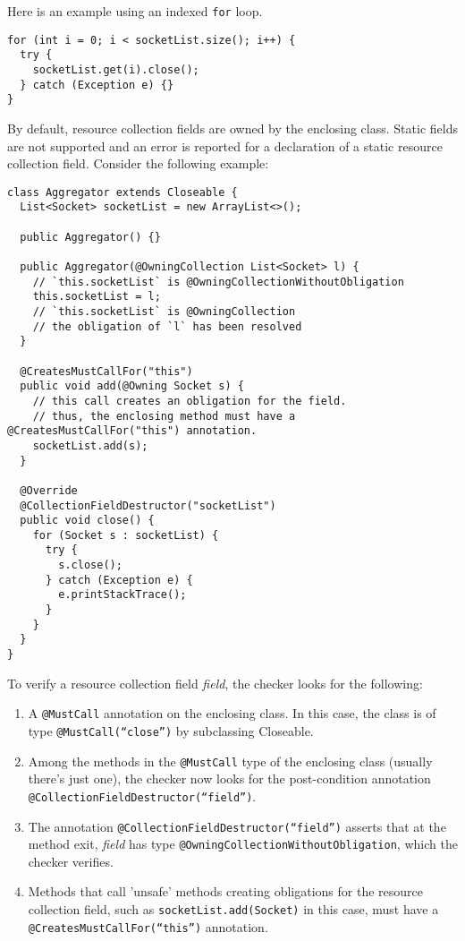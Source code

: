 Here is an example using an indexed \texttt{for} loop.

\begin{verbatim}
for (int i = 0; i < socketList.size(); i++) {
  try {
    socketList.get(i).close();
  } catch (Exception e) {}
}
\end{verbatim}

By default, resource collection fields are owned by the enclosing class. Static fields are not supported and an error is reported for a declaration of a static resource collection field.
Consider the following example:

\begin{verbatim}
class Aggregator extends Closeable {
  List<Socket> socketList = new ArrayList<>();

  public Aggregator() {}

  public Aggregator(@OwningCollection List<Socket> l) {
    // `this.socketList` is @OwningCollectionWithoutObligation
    this.socketList = l;
    // `this.socketList` is @OwningCollection
    // the obligation of `l` has been resolved
  }

  @CreatesMustCallFor("this")
  public void add(@Owning Socket s) {
    // this call creates an obligation for the field.
    // thus, the enclosing method must have a @CreatesMustCallFor("this") annotation.
    socketList.add(s);
  }

  @Override
  @CollectionFieldDestructor("socketList")
  public void close() {
    for (Socket s : socketList) {
      try {
        s.close();
      } catch (Exception e) {
        e.printStackTrace();
      }
    }
  }
}
\end{verbatim}

To verify a resource collection field \textit{field}, the checker looks for the following:
\begin{enumerate}
  \item A \texttt{@MustCall} annotation on the enclosing class. In this case, the class is of type \texttt{@MustCall(``close'')} by subclassing Closeable.
  \item Among the methods in the \texttt{@MustCall} type of the enclosing class (usually there's just one), the checker now looks for the post-condition annotation \texttt{@CollectionFieldDestructor(``field'')}.
  \item The annotation \texttt{@CollectionFieldDestructor(``field'')} asserts that at the method exit, \textit{field} has type \texttt{@OwningCollectionWithoutObligation}, which the checker verifies.
  \item Methods that call 'unsafe' methods creating obligations for the resource collection field, such as \texttt{socketList.add(Socket)} in this case, must have a \texttt{@CreatesMustCallFor(``this'')} annotation.
\end{enumerate}

